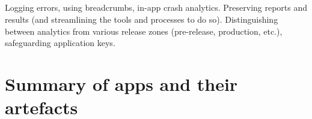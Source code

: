 \subsection{\iartefacts}
Logging errors, using breadcrumbs, in-app crash analytics. Preserving reports and results (and streamlining the tools and processes to do so). Distinguishing between analytics from various release zones (pre-release, production, etc.), safeguarding application keys.  


\section{Summary of apps and their artefacts}

